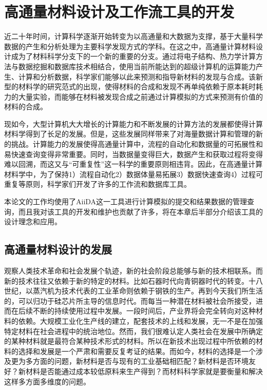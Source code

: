 \chapter{高通量材料设计及工作流工具的开发}
近二十年时间，计算科学逐渐开始转变为以高通量和大数据为支撑，基于大量科学数据的产生和分析处理为主要科学发现方式的学科。在这之中，高通量计算材料设计成为了材料科学分支下的一个新的重要的分支。通过将电子结构、热力学计算方法与数据挖掘和数据库技术相结合，使用当前所能达到的超级计算机的运算能力产生、计算和分析数据，科学家们能够以此来预测和指导新材料的发现与合成。该新型的材料学的研究范式的出现，使得材料的合成和发现不再单纯依赖于原本耗时耗力的大量实验，而能够在材料被发现合成之前通过计算模拟的方式来预测有价值的材料的合成。

现如今，大型计算机大大增长的计算能力和不断发展的计算方法的发展都使得计算材料学得到了长足的发展。但是，这些发展同样带来了对海量数据计算和管理的新的挑战。计算能力的发展使得高通量计算中，流程的自动化和数据量的可拓展性和易快速查询变得非常重要。同时，当数据量变得巨大，数据产生和获取过程将变得难以回溯，而这又与“可重复性”这一科学的重要原则相违背。因此，在高通量计算材料学中，为了保持1）流程自动化2）数据体量易拓展3）数据快速查询4）过程可重复等原则，科学家们开发了许多的工作流和数据库工具。

本论文的工作均使用了AiiDA\cite{pizzi2016aiida,huber2020aiida}这一工具进行计算模拟的提交和结果数据的管理查询，而且我对该工具的开发和维护也贡献了许多，将在本章后半部分介绍该工具的设计理念和应用。

\section{高通量材料设计的发展}
观察人类技术革命和社会发展个轨迹，新的社会阶段总能够与新的技术相联系。而新的技术往往又依赖于新的特定的材料。比如石器时代向青铜器时代的转变。十八世纪，以蒸汽机为技术代表的工业革命则依赖于钢铁的生产。再到今天我们所生活的，可以归功于硅芯片所主导的信息时代。而每当一种潜在材料被社会所接受，进而在后续不断的持续使用过程中发展。一段时间后，产业界将会完全转向对这种材料的依赖。大规模工业化生产线的建立，配套技术的上线和发展，无一不是在加强特定材料在社会进程中的统治地位。然而，我们很难认定人类社会在发展中所确定的某种材料就是最符合某种技术形式的材料。所以在新技术出现过程中所依赖的材料的选择和发展是一个严肃和需要反复考证的结果。而如今，材料的选择是一个涉及更为多方面的问题，新材料是否与现有的工业基础相匹配？新材料是否环境友好？新材料是否能通过成本较低原料来生产得到？而材料科学家就是要衡量和解决这样多方面多维度的问题。

